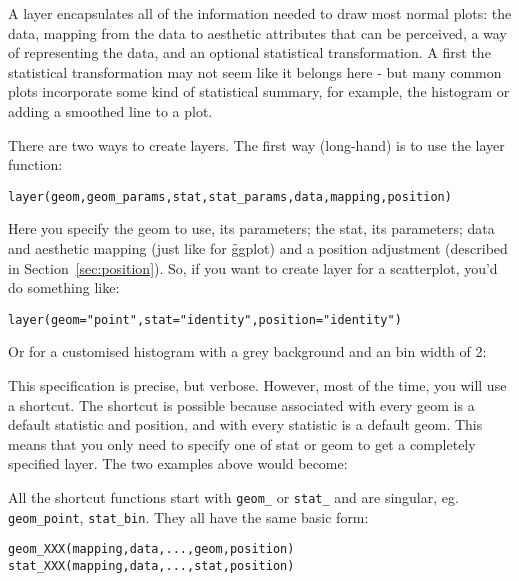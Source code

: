 A layer encapsulates all of the information needed to draw most normal plots:  the data, mapping from the data to aesthetic attributes that can be perceived, a way of representing the data, and an optional statistical transformation.  A first the statistical transformation may not seem like it belongs here - but many common plots incorporate some kind of statistical summary, for example, the histogram or adding a smoothed line to a plot.  

There are two ways to create layers.  The first way (long-hand) is to use the layer function:

\begin{alltt}
layer(geom, geom_params, stat, stat_params, data, mapping, position)
\end{alltt}

\noindent Here you specify the geom to use, its parameters; the stat, its parameters; data and aesthetic mapping (just like for \f{ggplot}) and a position adjustment (described in Section~\ref{sec:position}).  So, if you want to create layer for a scatterplot, you'd do something like:

\begin{alltt}
layer(geom = "point", stat = "identity", position = "identity")  
\end{alltt}

\noindent Or for a customised histogram with a grey background and an bin width of 2:

% 

\noindent  This specification is precise, but verbose.  However, most of the time, you will use a shortcut.  The shortcut is possible because associated with every geom is a default statistic and position, and with every statistic is a default geom.  This means that you only need to specify one of stat or geom to get a completely specified layer.  The two examples above would become:

% 

All the shortcut functions start with {\tt geom\_} or {\tt stat\_} and are singular, eg. {\tt geom\_point}, {\tt stat\_bin}.  They all have the same  basic form:

\begin{alltt}
geom_XXX(mapping, data, ..., geom, position)
stat_XXX(mapping, data, ..., stat, position)
\end{alltt}

